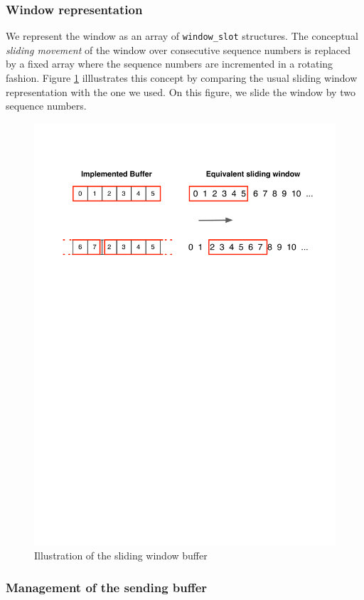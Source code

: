 \documentclass[11pt,a4paper,titlepage]{article}
\begin{document}
\subsubsection{Window representation}
We represent the window as an array of \texttt{window\_slot} structures. The conceptual \emph{sliding movement} of the window over consecutive sequence numbers is replaced by a fixed array where the sequence numbers are incremented in a rotating fashion.
Figure \ref{fig:sliding_win} illlustrates this concept by comparing the usual sliding window representation with the one we used. On this figure, we slide the window by two sequence numbers.
\begin{figure}[!ht]
	\centering
	\includegraphics[width=.7\textwidth]{figure/sliding_win.pdf}
	\caption{\label{fig:sliding_win} Illustration of the sliding window buffer}
\end{figure}


\subsubsection{Management of the sending buffer}
\end{document}
